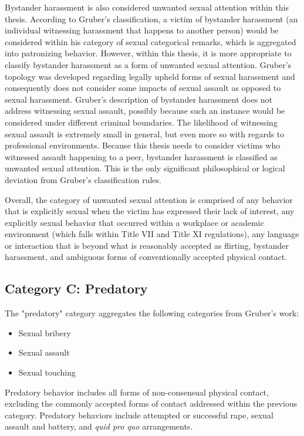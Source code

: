 Bystander harassment is also considered unwanted sexual attention within this thesis. According to Gruber's classification, a victim of bystander harassment (an individual witnessing harassment that happens to another person) would be considered within his category of sexual categorical remarks, which is aggregated into patronizing behavior. However, within this thesis, it is more appropriate to classify bystander harassment as a form of unwanted sexual attention. Gruber's topology was developed regarding legally upheld forms of sexual harassment and consequently does not consider some impacts of sexual assault as opposed to sexual harassment. Gruber's description of bystander harassment does not address witnessing sexual assault, possibly because such an instance would be considered under different criminal boundaries. The likelihood of witnessing sexual assault is extremely small in general, but even more so with regards to professional environments. Because this thesis needs to consider victims who witnessed assault happening to a peer, bystander harassment is classified as unwanted sexual attention. This is the only significant philosophical or logical deviation from Gruber's classification rules.

Overall, the category of unwanted sexual attention is comprised of any behavior that is explicitly sexual when the victim has expressed their lack of interest, any explicitly sexual behavior that occurred within a workplace or academic environment (which falls within Title VII and Title XI regulations), any language or interaction that is beyond what is reasonably accepted as flirting, bystander harassment, and ambiguous forms of conventionally accepted physical contact.

\subsection{Category C: Predatory}

The "predatory" category aggregates the following categories from Gruber's work:

\begin{itemize}
    \item Sexual bribery
    \item Sexual assault
    \item Sexual touching
\end{itemize}

Predatory behavior includes all forms of non-consensual physical contact, excluding the commonly accepted forms of contact addressed within the previous category. Predatory behaviors include attempted or successful rape, sexual assault and battery, and \textit{quid pro quo} arrangements.

